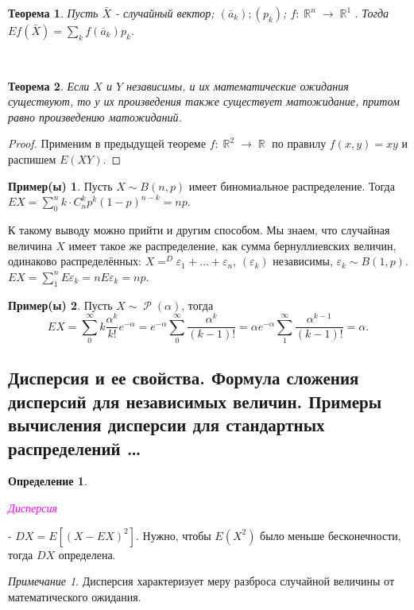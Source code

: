 \documentclass[a4paper,100pt]{article}
\theoremstyle{indented}
\newtheorem{theorem}{Теорема}
\theoremstyle{definition}
\newtheorem{defn}{Определение}
\newtheorem{exl}{Пример(ы)}
\theoremstyle{remark}
\newtheorem{remark}{Примечание}
\DeclareMathOperator{\RR}{\mathbb{R}}
\DeclareMathOperator{\Rho}{\mathcal{P}}
\begin{document}
\begin{theorem}
    Пусть $\bar{X}$ - случайный вектор; $(\bar{a}_k); (p_k)$; $f:\RR^n \rightarrow \RR^1$. Тогда $Ef(\bar{X}) = \sum_k f(\bar{a}_k)p_k$. 
\end{theorem} \

\begin{theorem}
    Если $X$ и $Y$ независимы, и их математические ожидания существуют, то у их произведения также существует матожидание, притом равно произведению матожиданий.
\end{theorem}

\begin{proof}
    Применим в предыдущей теореме $f: \RR^2 \rightarrow \RR$ по правилу $f(x, y)=xy$ и распишем $E(XY)$. 
\end{proof}

\begin{exl}
  Пусть $X \sim B(n, p)$ имеет биномиальное распределение. Тогда $EX=\sum_0^n k\cdot C_n^kp^k(1-p)^{n-k}=np$. \ 

  К такому выводу можно прийти и другим способом. Мы знаем, что случайная величина $X$ имеет такое же распределение, как сумма бернуллиевских величин, одинаково распределённых: $X=^D\varepsilon_1+\ldots+\varepsilon_n$, $(\varepsilon_k)$ независимы, $\varepsilon_k\sim B(1, p)$. $EX=\sum_1^n E\varepsilon_k=n E\varepsilon_k = np$. 
\end{exl}

\begin{exl}
  Пусть $X\sim \Rho(\alpha)$, тогда 
  \[
      EX = \sum_0^\infty k\frac{\alpha^k}{k!}e^{-\alpha} = e^{-\alpha}\sum_0^\infty \frac{\alpha^k}{(k-1)!} = \alpha e^{-\alpha}\sum_1^\infty \frac{\alpha^{k-1}}{(k-1)!}=\alpha.
  \] 
\end{exl}

\subsection{Дисперсия и ее свойства. Формула сложения дисперсий для независимых величин. Примеры вычисления дисперсии для стандартных распределений \ldots} 

\begin{defn}
  \hypertarget{n14}{\textcolor{magenta}{\textit{Дисперсия}}} - $DX = E[(X-EX)^2]$. Нужно, чтобы $E(X^2)$ было меньше бесконечности, тогда $DX$ определена.
\end{defn}

\begin{remark}
  Дисперсия характеризует меру разброса случайной величины от математического ожидания.
\end{remark}
\end{document}
